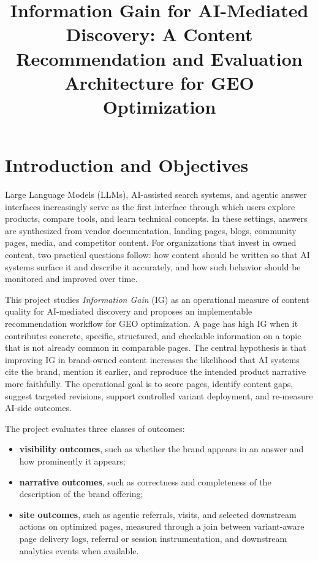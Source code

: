 \documentclass{article}
\title{Information Gain for AI-Mediated Discovery: A Content Recommendation and Evaluation Architecture for GEO Optimization}
\date{}
\begin{document}
\maketitle

\section{Introduction and Objectives}

Large Language Models (LLMs), AI-assisted search systems, and agentic answer interfaces increasingly serve as the first interface through which users explore products, compare tools, and learn technical concepts. In these settings, answers are synthesized from vendor documentation, landing pages, blogs, community pages, media, and competitor content. For organizations that invest in owned content, two practical questions follow: how content should be written so that AI systems surface it and describe it accurately, and how such behavior should be monitored and improved over time.

This project studies \emph{Information Gain} (IG) as an operational measure of content quality for AI-mediated discovery and proposes an implementable recommendation workflow for GEO optimization. A page has high IG when it contributes concrete, specific, structured, and checkable information on a topic that is not already common in comparable pages. The central hypothesis is that improving IG in brand-owned content increases the likelihood that AI systems cite the brand, mention it earlier, and reproduce the intended product narrative more faithfully. The operational goal is to score pages, identify content gaps, suggest targeted revisions, support controlled variant deployment, and re-measure AI-side outcomes.

The project evaluates three classes of outcomes:
\begin{itemize}
    \item \textbf{visibility outcomes}, such as whether the brand appears in an answer and how prominently it appears;
    \item \textbf{narrative outcomes}, such as correctness and completeness of the description of the brand offering;
    \item \textbf{site outcomes}, such as agentic referrals, visits, and selected downstream actions on optimized pages, measured through a join between variant-aware page delivery logs, referral or session instrumentation, and downstream analytics events when available.
\end{itemize}
\end{document}
